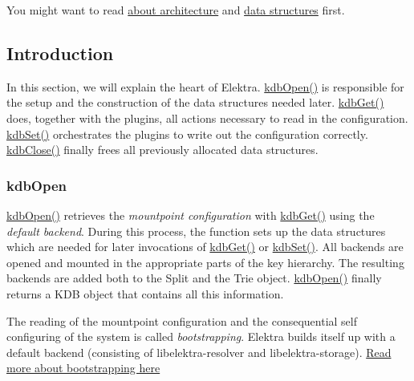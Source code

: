 You might want to read \hyperlink{doc_dev_architecture_md}{about architecture} and \hyperlink{doc_dev_data-structures_md}{data structures} first.

\subsection*{Introduction}

In this section, we will explain the heart of Elektra. {\ttfamily \hyperlink{group__kdb_ga6808defe5870f328dd17910aacbdc6ca}{kdb\+Open()}} is responsible for the setup and the construction of the data structures needed later. {\ttfamily \hyperlink{group__kdb_ga28e385fd9cb7ccfe0b2f1ed2f62453a1}{kdb\+Get()}} does, together with the plugins, all actions necessary to read in the configuration. {\ttfamily \hyperlink{group__kdb_ga11436b058408f83d303ca5e996832bcf}{kdb\+Set()}} orchestrates the plugins to write out the configuration correctly. {\ttfamily \hyperlink{group__kdb_gadb54dc9fda17ee07deb9444df745c96f}{kdb\+Close()}} finally frees all previously allocated data structures.

\subsubsection*{kdb\+Open}

{\ttfamily \hyperlink{group__kdb_ga6808defe5870f328dd17910aacbdc6ca}{kdb\+Open()}} retrieves the {\itshape mountpoint configuration} with {\ttfamily \hyperlink{group__kdb_ga28e385fd9cb7ccfe0b2f1ed2f62453a1}{kdb\+Get()}} using the {\itshape default backend}. During this process, the function sets up the data structures which are needed for later invocations of {\ttfamily \hyperlink{group__kdb_ga28e385fd9cb7ccfe0b2f1ed2f62453a1}{kdb\+Get()}} or {\ttfamily \hyperlink{group__kdb_ga11436b058408f83d303ca5e996832bcf}{kdb\+Set()}}. All backends are opened and mounted in the appropriate parts of the key hierarchy. The resulting backends are added both to the {\ttfamily Split} and the {\ttfamily Trie} object. {\ttfamily \hyperlink{group__kdb_ga6808defe5870f328dd17910aacbdc6ca}{kdb\+Open()}} finally returns a {\ttfamily K\+DB} object that contains all this information.

The reading of the mountpoint configuration and the consequential self configuring of the system is called {\itshape bootstrapping}. Elektra builds itself up with a default backend (consisting of {\ttfamily libelektra-\/resolver} and {\ttfamily libelektra-\/storage}). \hyperlink{md_doc_help_elektra-bootstrapping_doc_help_elektra-bootstrapping_md}{Read more about bootstrapping here}

